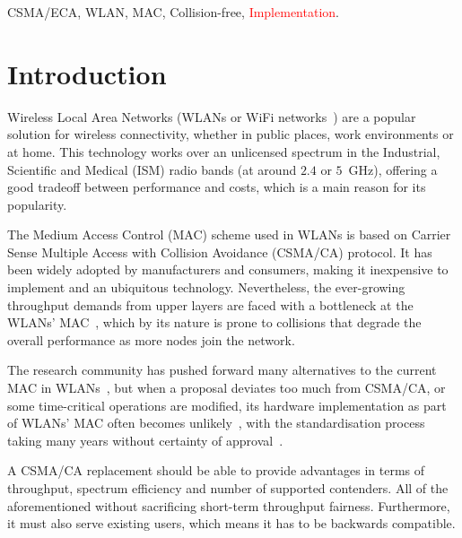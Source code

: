 \documentclass[a4paper,journal]{IEEEtran}
\begin{document}
\begin{IEEEkeywords}
CSMA/ECA, WLAN, MAC, Collision-free, \textcolor{red}{Implementation}.
\end{IEEEkeywords}

\section{Introduction}\label{introduction}
Wireless Local Area Networks (WLANs or WiFi networks~\cite{802Standards}) are a popular solution for wireless connectivity, whether in public places, work environments or at home. This technology works over an unlicensed spectrum in the Industrial, Scientific and Medical (ISM) radio bands (at around $2.4$ or $5$~GHz), offering a good tradeoff between performance and costs, which is a main reason for its popularity. 

The Medium Access Control (MAC) scheme used in WLANs is based on Carrier Sense Multiple Access with Collision Avoidance (CSMA/CA) protocol. It has been widely adopted by manufacturers and consumers, making it inexpensive to implement and an ubiquitous technology. Nevertheless, the ever-growing throughput demands from upper layers are faced with a bottleneck at the WLANs' MAC~\cite{perahia2008ieee}, which by its nature is prone to collisions that degrade the overall performance as more nodes join the network.

The research community has pushed forward many alternatives to the current MAC in WLANs~\cite{bharghavan1994map,wang2004ncr,cali2000dti,lopez-toledo2006aoi,
barcelo2008lba,bellalta2009vtc,HE,CSMA_ECA,L_MAC2,hui2011epp,barcelo2011tcf}, but when a proposal deviates too much from CSMA/CA, or some time-critical operations are modified, its hardware implementation as part of WLANs' MAC often becomes unlikely~\cite{WMP}, with the standardisation process taking many years without certainty of approval~\cite{perahia2008ieee}. 

A CSMA/CA replacement should be able to provide advantages in terms of throughput, spectrum efficiency and number of supported contenders. All of the aforementioned without sacrificing short-term throughput fairness. Furthermore, it must also serve existing users, which means it has to be backwards compatible.
\end{document}
